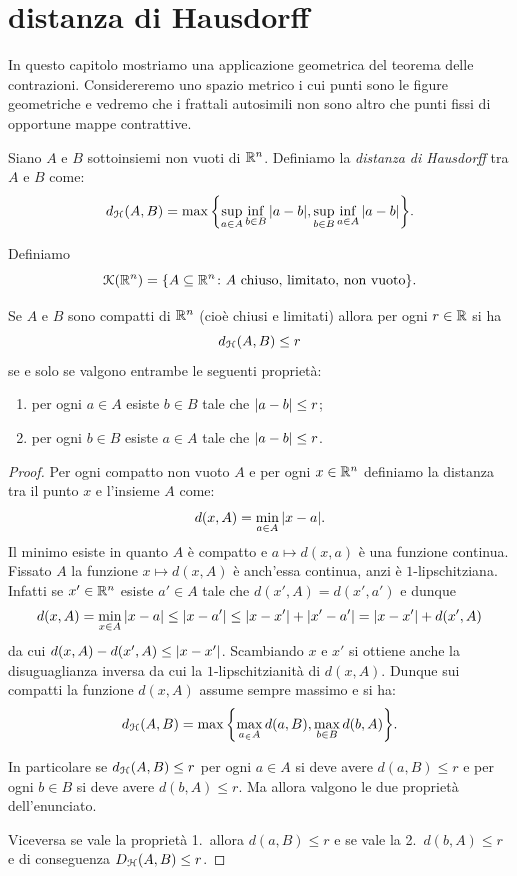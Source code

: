 \section{distanza di Hausdorff}

In questo capitolo mostriamo una applicazione geometrica del teorema delle contrazioni.
Considereremo uno spazio metrico i cui punti sono le figure geometriche
e vedremo che i frattali autosimili non sono altro che punti fissi
di opportune mappe contrattive.

\begin{definition}
Siano $A$ e $B$ sottoinsiemi non vuoti di ${\mathbb R}^n$.
Definiamo la \emph{distanza di Hausdorff}
tra $A$ e $B$ come:
\[
  d_{\mathcal H}(A,B) = \max{\left\{ \sup_{a\in A}\inf_{b\in B} {\left|a-b\right|}, \sup_{b\in B} \inf_{a\in A} {\left|a-b\right|} \right\}}.
\]

Definiamo
\[
 \mathcal K({\mathbb R}^n) = {\left\{ A \subseteq {\mathbb R}^n \colon \text{$A$ chiuso, limitato, non vuoto} \right\}}.
\]
\end{definition}

\begin{theorem}
Se $A$ e $B$ sono compatti di ${\mathbb R}^n$ (cioè chiusi e limitati) allora
per ogni $r \in {\mathbb R}$
si ha
\[
  d_\mathcal H(A,B) \le r
\]
se e solo se valgono entrambe le seguenti proprietà:
\begin{enumerate}
\item per ogni $a\in A$ esiste $b\in B$ tale che ${\left|a-b\right|}\le r$;
\item per ogni $b\in B$ esiste $a\in A$ tale che ${\left|a-b\right|}\le r$.
\end{enumerate}
\end{theorem}
%
\begin{proof}
Per ogni compatto non vuoto $A$ e per ogni $x\in {\mathbb R}^n$ definiamo
la distanza tra il punto $x$ e l'insieme $A$ come:
\[
  d(x,A) = \min_{a\in A} {\left|x-a\right|}.
\]
Il minimo esiste in quanto $A$ è compatto e $a\mapsto d(x,a)$ è una funzione continua. Fissato $A$ la funzione $x\mapsto d(x,A)$ è anch'essa continua, anzi è $1$-lipschitziana. Infatti se $x'\in {\mathbb R}^n$ esiste $a'\in A$ tale che $d(x',A) = d(x',a')$ e dunque
\[
  d(x,A) = \min_{x\in A} {\left|x-a\right|} \le {\left|x-a'\right|} \le {\left|x-x'\right|} + {\left|x'- a'\right|}
   = {\left|x-x'\right|} + d(x',A)
\]
da cui $d(x,A) - d(x',A)\le {\left|x-x'\right|}$.
Scambiando $x$ e $x'$ si ottiene anche la disuguaglianza inversa da cui la $1$-lipschitzianità di $d(x,A)$. Dunque sui compatti la funzione $d(x,A)$ assume sempre massimo e si ha:
\[
d_\mathcal H(A,B) = \max{\left\{ \max_{a_\in A} d(a,B), \max_{b\in B} d(b,A) \right\}}.
\]

In particolare se $d_\mathcal H(A,B) \le r$ per ogni $a\in A$ si deve avere $d(a,B) \le r$ e per ogni $b\in B$ si deve avere $d(b,A) \le r$. Ma allora valgono le due proprietà dell'enunciato.

Viceversa se vale la proprietà 1.\ allora $d(a,B)\le r$ e se vale la 2.\ $d(b,A)\le r$ e di conseguenza $D_\mathcal H(A,B) \le r$.
\end{proof}

